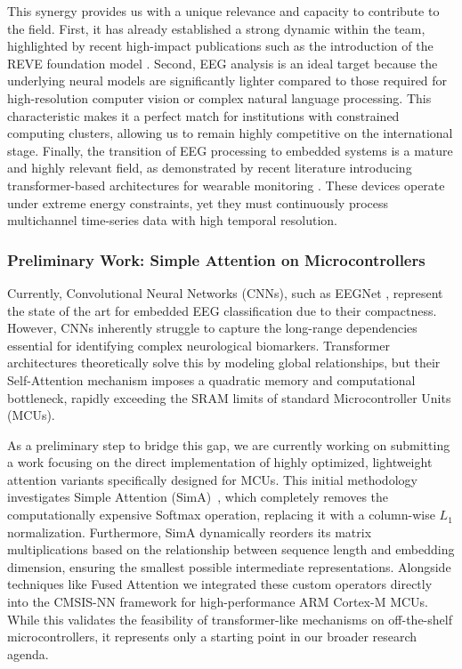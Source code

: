 \documentclass[11pt]{report}
\begin{document}
This synergy provides us with a unique relevance and capacity to contribute to the field. First, it has already established a strong dynamic within the team, highlighted by recent high-impact publications such as the introduction of the REVE foundation model \cite{reve_foundation_2024}. Second, EEG analysis is an ideal target because the underlying neural models are significantly lighter compared to those required for high-resolution computer vision or complex natural language processing. This characteristic makes it a perfect match for institutions with constrained computing clusters, allowing us to remain highly competitive on the international stage. Finally, the transition of EEG processing to embedded systems is a mature and highly relevant field, as demonstrated by recent literature introducing transformer-based architectures for wearable monitoring \cite{benini_eegformer_2023}. These devices operate under extreme energy constraints, yet they must continuously process multichannel time-series data with high temporal resolution.

\subsubsection{Preliminary Work: Simple Attention on Microcontrollers}
Currently, Convolutional Neural Networks (CNNs), such as EEGNet \cite{Lawhern2018}, represent the state of the art for embedded EEG classification due to their compactness. However, CNNs inherently struggle to capture the long-range dependencies essential for identifying complex neurological biomarkers. Transformer architectures theoretically solve this by modeling global relationships, but their Self-Attention mechanism imposes a quadratic memory and computational bottleneck, rapidly exceeding the SRAM limits of standard Microcontroller Units (MCUs).

As a preliminary step to bridge this gap, we are currently working on submitting a work focusing on the direct implementation of highly optimized, lightweight attention variants specifically designed for MCUs. This initial methodology investigates Simple Attention (SimA)~\cite{koohpayegani2024sima}, which completely removes the computationally expensive Softmax operation, replacing it with a column-wise $L_1$ normalization. Furthermore, SimA dynamically reorders its matrix multiplications based on the relationship between sequence length and embedding dimension, ensuring the smallest possible intermediate representations. Alongside techniques like Fused Attention we integrated these custom operators directly into the CMSIS-NN framework for high-performance ARM Cortex-M MCUs. While this validates the feasibility of transformer-like mechanisms on off-the-shelf microcontrollers, it represents only a starting point in our broader research agenda.
\end{document}
